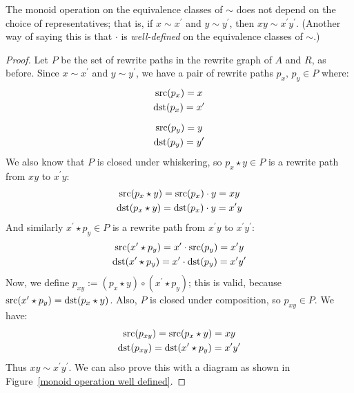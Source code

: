\documentclass[../generics]{subfiles}
\begin{document}
\begin{proposition}
%
The monoid operation on the equivalence classes of $\sim$ does not depend on the choice of representatives; that is, if $x\sim x^\prime$ and $y\sim y^\prime$, then $xy\sim x^\prime y^\prime$. (Another way of saying this is that $\cdot$ is \emph{well-defined} on the equivalence classes of $\sim$.)
\end{proposition}
\begin{proof}
Let $P$ be the set of rewrite paths in the rewrite graph of $A$ and $R$, as before. Since $x\sim x^\prime$ and $y\sim y^\prime$, we have a pair of rewrite paths $p_x,\,p_y\in P$ where:
\begin{gather*}
\operatorname{src}(p_x)=x\\
\operatorname{dst}(p_x)=x^\prime\\[\medskipamount]
\operatorname{src}(p_y)=y\\
\operatorname{dst}(p_y)=y^\prime
\end{gather*}
We also know that $P$ is closed under whiskering, so $p_x\star y\in P$ is a rewrite path from $xy$ to $x^\prime y$:
\begin{gather*}
\operatorname{src}(p_x\star y)=\operatorname{src}(p_x)\cdot y=xy\\
\operatorname{dst}(p_x\star y)=\operatorname{dst}(p_x)\cdot y=x^\prime y
\end{gather*}
And similarly $x^\prime\star p_y\in P$ is a rewrite path from $x^\prime y$ to $x^\prime y^\prime$:
\begin{gather*}
\operatorname{src}(x^\prime \star p_y)=x^\prime \cdot\operatorname{src}(p_y)=x^\prime y\\
\operatorname{dst}(x^\prime \star p_y)=x^\prime \cdot\operatorname{dst}(p_y)=x^\prime y^\prime
\end{gather*}
Now, we define $p_{xy}:=(p_x\star y) \circ (x^\prime\star p_y)$; this is valid, because $\operatorname{src}(x^\prime \star p_y)=\operatorname{dst}(p_x\star y)$.
Also, $P$ is closed under composition, so $p_{xy}\in P$. We have:
\begin{gather*}
\operatorname{src}(p_{xy}) = \operatorname{src}(p_x\star y) = xy\\
\operatorname{dst}(p_{xy}) = \operatorname{dst}(x^\prime \star p_y) = x^\prime y^\prime
\end{gather*}
Thus $xy\sim x^\prime y^\prime$. We can also prove this with a diagram as shown in Figure~\ref{monoid operation well defined}.
\end{proof}
\end{document}
